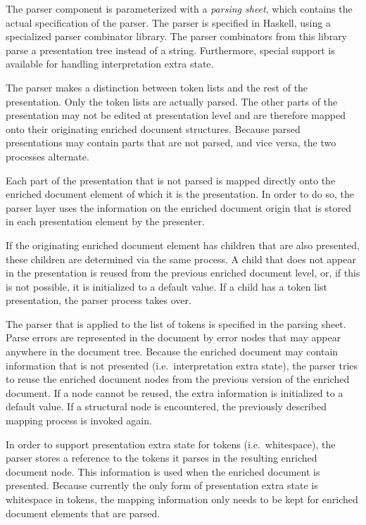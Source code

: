 The parser component is parameterized with a {\em parsing sheet}, which contains the actual specification of the parser. The parser is specified in Haskell, using a specialized parser combinator library. The parser combinators from this library parse a presentation tree instead of a string. Furthermore, special support is available for handling interpretation extra state.

The parser makes a distinction between token lists and the rest of the presentation. Only the token lists are actually parsed. The other parts of the presentation may not be edited at presentation level and are therefore mapped onto their originating enriched document structures. Because parsed presentations may contain parts that are not parsed, and vice versa, the two processes alternate.

Each part of the presentation that is not parsed is mapped directly onto the enriched document element of which it is the presentation. In order to do so, the parser layer uses the information on the enriched document origin that is stored in each presentation element by the presenter.

If the originating enriched document element has children that are also presented, these children are determined via the same process. A child that does not appear in the presentation is reused from the previous enriched document level, or, if this is not possible, it is initialized to a default value. If a child has a token list presentation, the parser process takes over.

The parser that is applied to the list of tokens is specified  in the parsing sheet. Parse errors are represented in the document by error nodes that may appear anywhere in the document tree. Because the enriched document may contain information that is not presented (i.e.\ interpretation extra state), the parser tries to reuse the enriched document nodes from the previous version of the enriched document. If a node cannot be reused, the extra information is initialized to a default value. If a structural node is encountered, the previously described mapping process is invoked again.

In order to support presentation extra state for tokens (i.e.\ whitespace), the parser stores a reference to the tokens it parses in the resulting enriched document node. This information is used when the enriched document is presented. Because currently the only form of presentation extra state is whitespace in tokens, the mapping information only needs to be kept for enriched document elements that are parsed.

